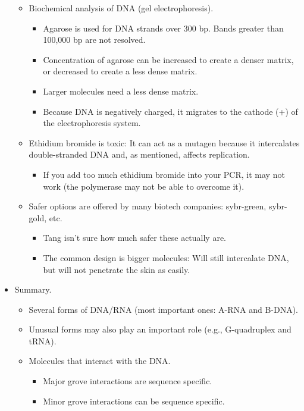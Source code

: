 \documentclass[../notes.tex]{subfiles}
\begin{document}
\begin{itemize}
    \begin{itemize}
        \item Biochemical analysis of DNA (gel electrophoresis).
        \begin{itemize}
            \item Agarose is used for DNA strands over 300 bp. Bands greater than 100,000 bp are not resolved.
            \item Concentration of agarose can be increased to create a denser matrix, or decreased to create a less dense matrix.
            \item Larger molecules need a less dense matrix.
            \item Because DNA is negatively charged, it migrates to the cathode (+) of the electrophoresis system.
        \end{itemize}
        \item Ethidium bromide is toxic: It can act as a mutagen because it intercalates double-stranded DNA and, as mentioned, affects replication.
        \begin{itemize}
            \item If you add too much ethidium bromide into your PCR, it may not work (the polymerase may not be able to overcome it).
        \end{itemize}
        \item Safer options are offered by many biotech companies: sybr-green, sybr-gold, etc.
        \begin{itemize}
            \item Tang isn't sure how much safer these actually are.
            \item The common design is bigger molecules: Will still intercalate DNA, but will not penetrate the skin as easily.
        \end{itemize}
    \end{itemize}
    \item Summary.
    \begin{itemize}
        \item Several forms of DNA/RNA (most important ones: A-RNA and B-DNA).
        \item Unusual forms may also play an important role (e.g., G-quadruplex and tRNA).
        \item Molecules that interact with the DNA.
        \begin{itemize}
            \item Major grove interactions are sequence specific.
            \item Minor grove interactions can be sequence specific.

\end{itemize}
\end{itemize}
\end{itemize}
\end{document}
